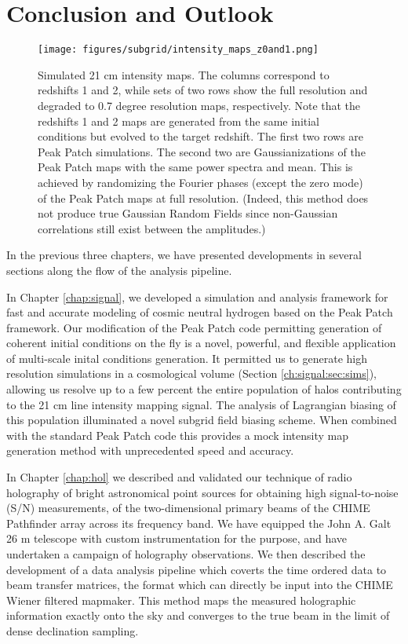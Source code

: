 \chapter{Conclusion and Outlook}
\label{chap:conclusion}


\begin{figure} %
\begin{center}
\texttt{[image: figures/subgrid/intensity\_maps\_z0and1.png]}
\caption{Simulated 21 cm intensity maps. The columns correspond to redshifts 1 and 2, while sets of two rows show the full resolution and degraded to 0.7 degree resolution maps, respectively. Note that the redshifts 1 and 2 maps are generated from the same initial conditions but evolved to the target redshift. The first two rows are Peak Patch simulations. The second two are Gaussianizations of the Peak Patch maps with the same power spectra and mean. This is achieved by randomizing the Fourier phases (except the zero mode) of the Peak Patch maps at full resolution. (Indeed, this method does not produce true Gaussian Random Fields since non-Gaussian correlations still exist between the amplitudes.)}
\label{intensitymaps}
\end{center}
\end{figure}

In the previous three chapters, we have presented developments in several sections along the flow of the analysis pipeline.

In Chapter \ref{chap:signal}, we developed a simulation and analysis framework for fast and accurate modeling of cosmic neutral hydrogen based on the Peak Patch framework. Our modification of the Peak Patch code permitting generation of coherent initial conditions on the fly is a novel, powerful, and flexible application of multi-scale inital conditions generation. It permitted us to generate high resolution simulations in a cosmological volume (Section \ref{ch:signal:sec:sims}), allowing us resolve up to a few percent the entire population of halos contributing to the 21 cm line intensity mapping signal. The analysis of Lagrangian biasing of this population illuminated a novel subgrid field biasing scheme. When combined with the standard Peak Patch code this provides a mock intensity map generation method with unprecedented speed and accuracy.

In Chapter \ref{chap:hol} we described and validated our technique of radio holography of bright astronomical point sources for obtaining high signal-to-noise (S/N) measurements, of the two-dimensional primary beams of the CHIME Pathfinder array across its frequency band. We have equipped the John A. Galt 26 m telescope with custom instrumentation for the purpose, and have undertaken a campaign of holography observations. We then described the development of a data analysis pipeline which coverts the time ordered data to beam transfer matrices, the format which can directly be input into the CHIME Wiener filtered mapmaker. This method maps the measured holographic information exactly onto the sky and converges to the true beam in the limit of dense declination sampling.

